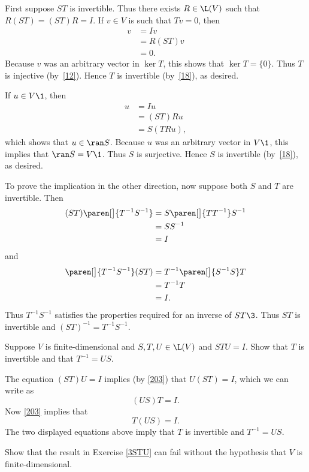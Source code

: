 \begin{Solution}
First suppose $ST$ is invertible.  Thus there exists $R \in \L(V)$ such that
$R(ST) = (ST)R = I$.  If $v \in V$ is such that $Tv = 0$,  then
\begin{align*}
v &= Iv \\
&= R(ST)v \\
&= 0.
\end{align*}
Because $v$ was an arbitrary vector in $\ker T$, this shows that $\ker T = \{0\}$.
Thus $T$ is injective (by~\ref{12}). Hence
$T$ is invertible (by~\ref{18}), as desired.

If $u \in V\1$, then
\begin{align*}
u &= Iu \\
&= (ST)Ru \\
&= S(TRu),
\end{align*}
which shows that $u \in \ran S$.  Because $u$ was an arbitrary vector in $V\1$,
this implies that $\ran S = V\1$.  Thus $S$ is surjective. Hence $S$ is
invertible (by~\ref{18}), as desired.

To prove the implication in the other direction, now suppose both $S$ and $T$
are invertible.  Then
\begin{align*}
(ST)\paren[\big]{T^{-1} S^{-1}} &= S\paren[\big]{TT^{-1}}S^{-1} \\
&= SS^{-1} \\
&= I
\end{align*}
and
\begin{align*}
\paren[\big]{T^{-1} S^{-1}}(ST) &= T^{-1}\paren[\big]{S^{-1}S}T \\
&= T^{-1}T \\
&= I.
\end{align*}
Thus $T^{-1} S^{-1}$ satisfies the properties required for an inverse of $ST\3$.
Thus $ST$ is invertible and $(ST)^{-1} = T^{-1} S^{-1}$.
\end{Solution}

\exercise
Suppose $V$ is finite-dimensional and $S, T, U \in \L(V)$ and
$
STU = I$.
Show that $T$ is invertible and that $T^{-1} = US$.\label{3STU}

\begin{Solution}
The equation $(ST)U = I$ implies (by \ref{203}) that $U(ST) = I$, which we can write as
\[
(US)T =I.
\]
Now \ref{203} implies that
\[
T(US) = I.
\]
The two displayed equations above imply that $T$ is invertible and $T^{-1} = US$.
\end{Solution}

\exercise
Show that the result in Exercise \ref{3STU} can fail without the hypothesis that $V$ is finite-dimensional.

